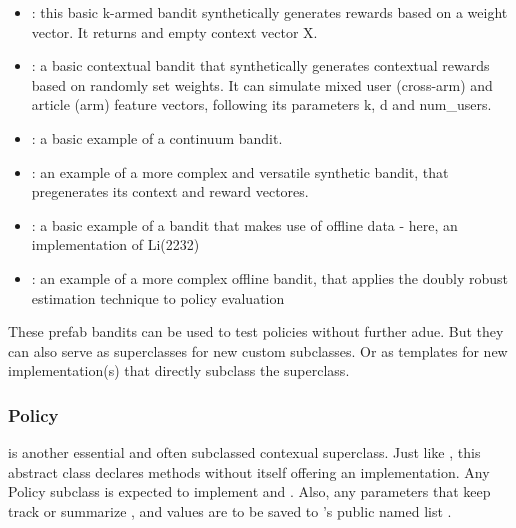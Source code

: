 \documentclass[nojss]{jss}\usepackage[]{graphicx}\usepackage[]{color}
\begin{document}
\begin{itemize}
         \item {}: this basic k-armed bandit synthetically generates rewards based on a weight vector. It returns and empty context vector X.
         \item {}: a basic contextual bandit that synthetically generates contextual rewards based on randomly set weights. It can simulate mixed user (cross-arm) and article (arm) feature vectors, following its parameters k, d and num\_users.
         \item {}: a basic example of a continuum bandit.
         \item {}: an example of a more complex and versatile synthetic bandit, that pregenerates its context and reward vectores.
         \item {}: a basic example of a bandit that makes use of offline data - here, an implementation of Li(2232)
         \item {}: an example of a more complex offline bandit, that applies the doubly robust estimation technique to policy evaluation
\end{itemize}

These prefab bandits can be used to test policies without further adue. But they can also serve as superclasses for new custom  subclasses. Or as templates for new  implementation(s) that directly subclass the  superclass.

\subsubsection{Policy}

 is another essential and often subclassed contexual superclass. Just like , this abstract class declares methods without itself offering an implementation. Any Policy subclass is expected to implement  and . Also, any parameters that keep track or summarize ,  and  values are to be saved to 's public named list .
\end{document}
